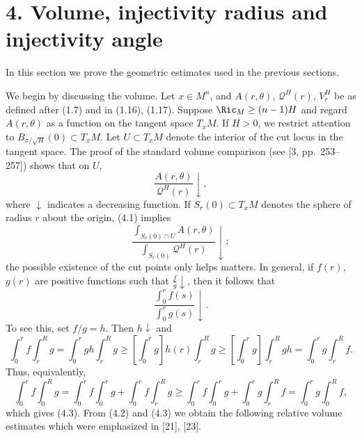 \chapter{4. Volume, injectivity radius and injectivity angle}

In this section we prove the geometric estimates used in the previous sections.

We begin by discussing the volume. Let $x\in M^n$, and $A(r,\theta)$,
$\mathcal{Q}^H(r)$, $V_r^H$ be as defined after (1.7) and in (1.16), (1.17).
Suppose $\Ric_M\geq (n-1)H$ and regard $A(r,\theta)$ as a function on the tangent
space $T_xM$. If $H>0$, we restrict attention to $B_{\pi/\sqrt{H}}(0)\subset T_xM$.
Let $U\subset T_xM$ denote the interior of the cut locus in the tangent space.
The proof of the standard volume comparison (see [3, pp.\ 253--257]) shows that
on $U$,
\begin{equation}
\tag{4.1}
\frac{A(r,\theta)}{\mathcal{Q}^H(r)}\downarrow,
\end{equation}
where $\downarrow$ indicates a decreasing function. If $S_r(0)\subset T_xM$ denotes
the sphere of radius $r$ about the origin, (4.1) implies
\begin{equation}
\tag{4.2}
\frac{\int_{S_r(0)\cap U} A(r,\theta)}{\int_{S_r(0)} \mathcal{Q}^H(r)}\downarrow;
\end{equation}
the possible existence of the cut points only helps matters. In general, if
$f(r)$, $g(r)$ are positive functions such that $\frac{f}{g}\downarrow$, then it follows that
\begin{equation}
\tag{4.3}
\frac{\int_0^r f(s)}{\int_0^r g(s)}\downarrow.
\end{equation}
To see this, set $f/g=h$. Then $h\downarrow$ and
\begin{equation}
\tag{4.4}
\int_0^r f \int_r^R g
= \int_0^r gh \int_r^R g
\geq \left[\int_0^r g\right] h(r)\int_r^R g
\geq \left[\int_0^r g\right]\int_r^R gh
= \int_0^r g \int_r^R f.
\end{equation}
Thus, equivalently,
\begin{equation}
\tag{4.5}
\int_0^r f \int_0^R g
= \int_0^r f \int_0^r g + \int_0^r f \int_r^R g
\geq \int_0^r f \int_0^r g + \int_0^r g \int_r^R f
= \int_0^r g \int_0^R f,
\end{equation}
which gives (4.3). From (4.2) and (4.3) we obtain the following relative volume
estimates which were emphasized in [21], [23].


